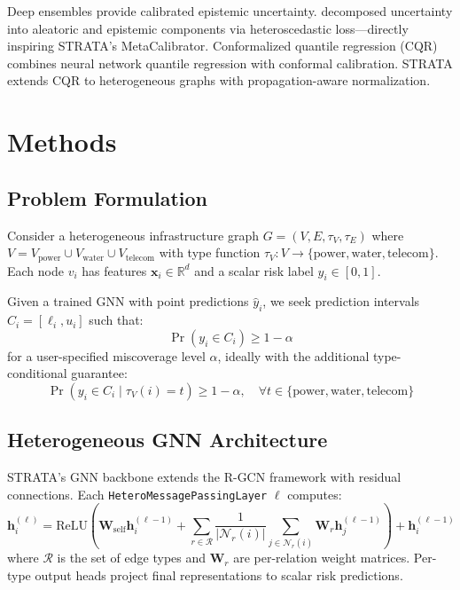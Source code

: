 \documentclass[twoside,11pt]{article}
\begin{document}
Deep ensembles \citep{lakshminarayanan2017simple} provide calibrated epistemic
uncertainty. \citet{kendall2017uncertainties} decomposed uncertainty into
aleatoric and epistemic components via heteroscedastic loss---directly inspiring
STRATA's MetaCalibrator. Conformalized quantile regression (CQR)
\citep{romano2019conformalized} combines neural network quantile regression
\citep{koenker1978regression} with conformal calibration. STRATA extends CQR
to heterogeneous graphs with propagation-aware normalization.

\section{Methods}
\label{sec:methods}

\subsection{Problem Formulation}

Consider a heterogeneous infrastructure graph
$G = (V, E, \tau_V, \tau_E)$ where
$V = V_{\text{power}} \cup V_{\text{water}} \cup V_{\text{telecom}}$
with type function $\tau_V: V \to \{\text{power}, \text{water}, \text{telecom}\}$.
Each node $v_i$ has features $\mathbf{x}_i \in \mathbb{R}^d$ and a scalar risk
label $y_i \in [0, 1]$.

Given a trained GNN with point predictions $\hat{y}_i$, we seek prediction
intervals $C_i = [\ell_i, u_i]$ such that:
\begin{equation}
\Pr(y_i \in C_i) \geq 1 - \alpha
\end{equation}
for a user-specified miscoverage level $\alpha$, ideally with the additional
type-conditional guarantee:
\begin{equation}
\Pr(y_i \in C_i \mid \tau_V(i) = t) \geq 1 - \alpha, \quad
\forall t \in \{\text{power}, \text{water}, \text{telecom}\}
\end{equation}

\subsection{Heterogeneous GNN Architecture}

STRATA's GNN backbone extends the R-GCN framework \citep{schlichtkrull2018modeling}
with residual connections. Each \texttt{HeteroMessagePassingLayer} $\ell$ computes:
\begin{equation}
\mathbf{h}_i^{(\ell)} = \text{ReLU}\!\left(\mathbf{W}_{\text{self}}
\mathbf{h}_i^{(\ell-1)} + \sum_{r \in \mathcal{R}}
\frac{1}{|\mathcal{N}_r(i)|} \sum_{j \in \mathcal{N}_r(i)}
\mathbf{W}_r \mathbf{h}_j^{(\ell-1)}\right) + \mathbf{h}_i^{(\ell-1)}
\end{equation}
where $\mathcal{R}$ is the set of edge types and $\mathbf{W}_r$ are
per-relation weight matrices. Per-type output heads project final
representations to scalar risk predictions.
\end{document}
